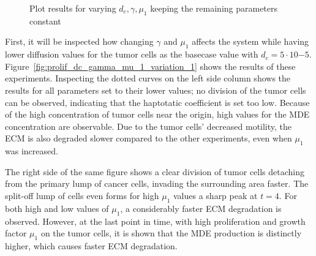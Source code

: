 \begin{figure}[h!]
    \centering
    \caption{Plot results for varying $d_c,\gamma,\mu_1$ keeping the remaining parameters constant}
    \label{fig:prolif_dc_gamma_mu_1_variation_2}
\end{figure}

First, it will be inspected how changing $\gamma$ and $\mu_1$ affects the system while having lower diffusion values for the tumor cells as the basecase value with $d_c=5\cdot 10{-5}$. Figure~\ref{fig:prolif_dc_gamma_mu_1_variation_1} shows the results of these experiments. Inspecting the dotted curves on the left side column shows the results for all parameters set to their lower values; no division of the tumor cells can be observed, indicating that the haptotatic coefficient is set too low. Because of the high concentration of tumor cells near the origin, high values for the MDE concentration are observable. Due to the tumor cells' decreased motility, the ECM is also degraded slower compared to the other experiments, even when $\mu_1$ was increased. 

The right side of the same figure shows a clear division of tumor cells detaching from the primary lump of cancer cells, invading the surrounding area faster. The split-off lump of cells even forms for high $\mu_1$ values a sharp peak at $t=4$. For both high and low values of $\mu_1$, a considerably faster ECM degradation is observed. However, at the last point in time, with high proliferation and growth factor $\mu_1$ on the tumor cells, it is shown that the MDE production is distinctly higher, which causes faster ECM degradation.

